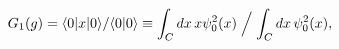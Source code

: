 \begin{equation}
G_1(g)=\langle0|x|0\rangle/\langle0|0\rangle\equiv\int_C dx\,x
\psi_0^2(x)\Bigm/\int_C dx\,\psi_0^2(x), \label{e36}
\end{equation}

